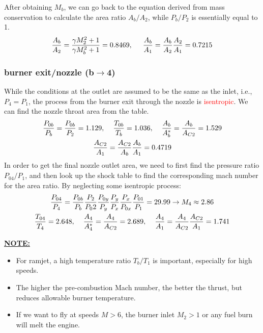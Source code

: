 \documentclass[a4paper,10pt]{article}
\begin{document}
After obtaining $M_b$, we can go back to the equation derived from mass conservation to calculate the area ratio $A_b/A_2$, while $P_b/P_2$ is essentially equal to 1. 
\begin{gather*}
    \frac{A_b}{A_2}=\frac{\gamma M_2^2+1}{\gamma M_b^2+1} = 0.8469,\hspace*{0.5cm}\frac{A_b}{A_1}=\frac{A_b}{A_2}\frac{A_2}{A_1} = 0.7215
\end{gather*}

\subsubsection{burner exit/nozzle (b$\rightarrow$4)}
While the conditions at the outlet are assumed to be the same as the inlet, i.e., $P_4=P_1$, the process from the burner exit through the nozzle is \textcolor{red}{isentropic}. We can find the nozzle throat area from the table. 
\begin{gather*}
    \frac{P_{0b}}{P_b}=\frac{P_{0b}}{P_2} = 1.129, \hspace*{0.4cm}\frac{T_{0b}}{T_b} = 1.036,\hspace*{0.4cm}\frac{A_b}{A_b^*} = \frac{A_b}{A_{C2}}=1.529\\
    \frac{A_{C2}}{A_1} = \frac{A_{C2}}{A_b}\frac{A_b}{A_1} = 0.4719
\end{gather*}
In order to get the final nozzle outlet area, we need to first find the pressure ratio $P_04/P_1$, and then look up the shock table to find the corresponding mach number for the area ratio. By neglecting some isentropic process:
\begin{gather*}
    \frac{P_{04}}{P_4}=\frac{P_{0b}}{P_b}\frac{P_2}{P_02}\frac{P_{0y}}{P_y}\frac{P_y}{P_x}\frac{P_x}{P_{0x}}\frac{P_{01}}{P_1} = 29.99\rightarrow M_4\approx2.86\\
    \frac{T_{04}}{T_4} = 2.648,\hspace*{0.4cm}\frac{A_4}{A_4^*}=\frac{A_4}{A_{C2}} = 2.689,\hspace*{0.4cm}\frac{A_4}{A_1}=\frac{A_4}{A_{C2}}\frac{A_{C2}}{A_1} = 1.741
\end{gather*}

\vspace*{-0.4cm}
\underline{\textbf{NOTE:}}
\begin{itemize}
    \item For ramjet, a high temperature ratio $T_b/T_1$ is important, especially for high speeds. 
    \item The higher the pre-combustion Mach number, the better the thrust, but reduces allowable burner temperature.
    \item If we want to fly at speeds $M>6$, the burner inlet $M_2>1$ or any fuel burn will melt the engine. 
\end{itemize}
\end{document}
